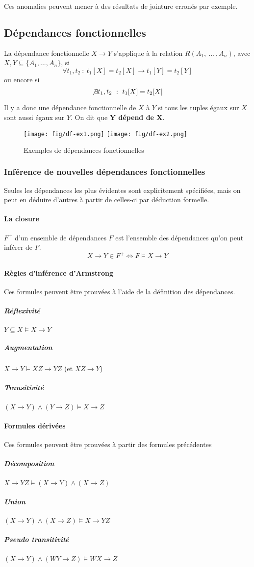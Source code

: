 \documentclass[a4paper]{article}
\begin{document}
Ces anomalies peuvent mener à des résultats de jointure erronés par exemple.

\subsection{Dépendances fonctionnelles}
La dépendance fonctionnelle $X \rightarrow Y$ s'applique à la relation $R(A_1, ~...~, A_n)$,
avec $X,Y \subseteq \{A_1, ..., A_n\}$, si
$$ \forall t_1,t_2 ~:~ t_1[X] = t_2[X] \rightarrow t_1[Y] = t_2[Y] $$
ou encore si
$$ \not\exists t_1,t_2 ~:~ t_1[X] = t_2[X] $$

Il y a donc une dépendance fonctionnelle de $X$ à $Y$ si tous les tuples égaux
sur $X$ sont aussi égaux sur $Y$. On dit que \textbf{Y dépend de X}.

\begin{figure}[H]
\center
\texttt{[image: fig/df-ex1.png]}
\texttt{[image: fig/df-ex2.png]}
\caption{Exemples de dépendances fonctionnelles}
\end{figure}

\subsubsection{Inférence de nouvelles dépendances fonctionnelles}
Seules les dépendances les plus évidentes sont explicitement spécifiées, mais on
peut en déduire d'autres à partir de celles-ci par déduction formelle.

\paragraph{La closure} $F^+$ d'un ensemble de dépendances $F$ est l'ensemble des
dépendances qu'on peut inférer de $F$.
$$ X \rightarrow Y \in F^+ \Leftrightarrow F \models X \rightarrow Y $$

\paragraph{Règles d'inférence d'Armstrong}
Ces formules peuvent être prouvées à l'aide de la définition des dépendances.
\subparagraph{Réflexivité} $ Y \subseteq X \models X \rightarrow Y $
\subparagraph{Augmentation} $ X \rightarrow Y \models XZ \rightarrow YZ $ (et $ XZ \rightarrow Y$)
\subparagraph{Transitivité} $ (X \rightarrow Y) \land (Y \rightarrow Z) \models X \rightarrow Z $

\paragraph{Formules dérivées}
Ces formules peuvent être prouvées à partir des formules précédentes
\subparagraph{Décomposition} $ X \rightarrow YZ \models (X \rightarrow Y) \land (X \rightarrow Z) $
\subparagraph{Union} $ (X \rightarrow Y) \land (X \rightarrow Z) \models X \rightarrow YZ $
\subparagraph{Pseudo transitivité} $ (X \rightarrow Y) \land (WY \rightarrow Z) \models WX \rightarrow Z $
\end{document}
